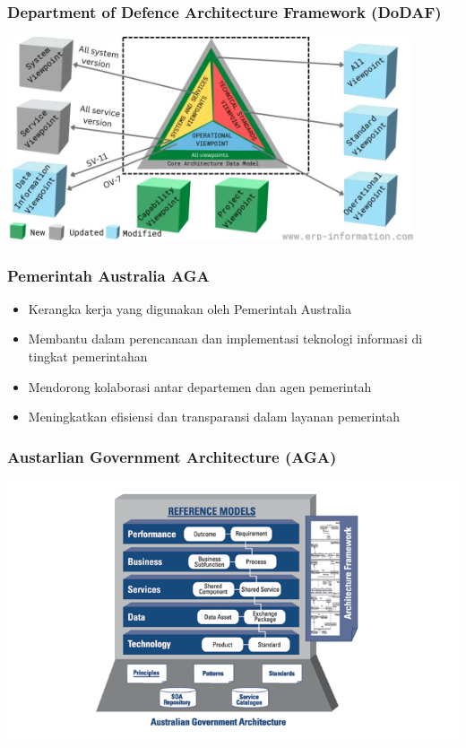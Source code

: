 \documentclass{beamer}
\begin{document}
	{
		\begin{frame}
			\frametitle{Department of Defence Architecture Framework (DoDAF)}
			\begin{center}
				\includegraphics[width=0.9\textwidth]{../figures/dodaf}
			\end{center}
		\end{frame}
	}

	\begin{frame}
		\frametitle{Pemerintah Australia AGA}
		\begin{itemize}
			\item Kerangka kerja yang digunakan oleh Pemerintah Australia
			\item Membantu dalam perencanaan dan implementasi teknologi informasi di tingkat pemerintahan
			\item Mendorong kolaborasi antar departemen dan agen pemerintah
			\item Meningkatkan efisiensi dan transparansi dalam layanan pemerintah
		\end{itemize}
	\end{frame}
	
	{
		\begin{frame}
			\frametitle{Austarlian Government Architecture (AGA)}
			\begin{center}
				\includegraphics[width=1.1\textwidth]{../figures/aga}
			\end{center}
		\end{frame}
	}
	
\end{document}

